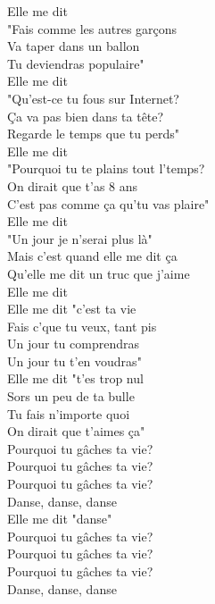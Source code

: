 \documentclass{novel}
\begin{document}
\begin{multicols}{2}
Elle me dit \\
"Fais comme les autres garçons \\
Va taper dans un ballon \\
Tu deviendras populaire" \\

Elle me dit \\
"Qu'est-ce tu fous sur Internet? \\
Ça va pas bien dans ta tête? \\
Regarde le temps que tu perds" \\

Elle me dit \\
"Pourquoi tu te plains tout l'temps? \\
On dirait que t'as 8 ans \\
C'est pas comme ça qu'tu vas plaire" \\

Elle me dit \\
"Un jour je n'serai plus là" \\
Mais c'est quand elle me dit ça \\
Qu'elle me dit un truc que j'aime \\
Elle me dit \\

Elle me dit "c'est ta vie \\
Fais c'que tu veux, tant pis \\
Un jour tu comprendras \\
Un jour tu t'en voudras" \\

Elle me dit "t'es trop nul \\
Sors un peu de ta bulle \\
Tu fais n'importe quoi \\
On dirait que t'aimes ça" \\

Pourquoi tu gâches ta vie? \\
Pourquoi tu gâches ta vie? \\
Pourquoi tu gâches ta vie? \\
Danse, danse, danse \\
Elle me dit "danse" \\

Pourquoi tu gâches ta vie? \\
Pourquoi tu gâches ta vie? \\
Pourquoi tu gâches ta vie? \\
Danse, danse, danse \\


\end{multicols}
\end{document}
